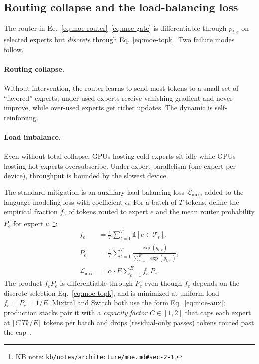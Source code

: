 \subsection{Routing collapse and the load-balancing loss}
\label{sec:ffn-load-balance}

The router in Eq.~\eqref{eq:moe-router}--\eqref{eq:moe-gate} is
differentiable through $p_{t,e}$ on selected experts but
\emph{discrete} through Eq.~\eqref{eq:moe-topk}. Two failure modes
follow.

\paragraph{Routing collapse.}
Without intervention, the router learns to send most tokens to a small
set of ``favored'' experts; under-used experts receive vanishing
gradient and never improve, while over-used experts get richer
updates. The dynamic is self-reinforcing.

\paragraph{Load imbalance.}
Even without total collapse, GPUs hosting cold experts sit idle while
GPUs hosting hot experts oversubscribe. Under expert parallelism
(one expert per device), throughput is bounded by the slowest device.

The standard mitigation is an auxiliary load-balancing loss
$\mathcal{L}_{\text{aux}}$, added to the language-modeling loss with
coefficient $\alpha$. For a batch of $T$ tokens, define the empirical
fraction $f_e$ of tokens routed to expert $e$ and the mean router
probability $P_e$ for expert
$e$~\citep[\S 2.2]{fedus2021-switch}\footnote{KB note:
\texttt{kb/notes/architecture/moe.md\#sec-2-1}. }:
\begin{align}
  f_e &= \frac{1}{T} \sum_{t=1}^T \mathbb{1}\!\left[e \in \mathcal{T}_t\right], \label{eq:moe-fe} \\
  P_e &= \frac{1}{T} \sum_{t=1}^T \frac{\exp(g_{t,e})}{\sum_{e'=1}^E \exp(g_{t,e'})}, \label{eq:moe-pe} \\
  \mathcal{L}_{\text{aux}} &= \alpha \cdot E \sum_{e=1}^{E} f_e\, P_e. \label{eq:moe-aux}
\end{align}
The product $f_e P_e$ is differentiable through $P_e$ even though
$f_e$ depends on the discrete selection
Eq.~\eqref{eq:moe-topk}, and is minimized at uniform load
$f_e = P_e = 1/E$. Mixtral and Switch both use the form
Eq.~\eqref{eq:moe-aux}; production stacks pair it with a
\emph{capacity factor} $C \in [1, 2]$ that caps each expert at
$\lceil C\,T k / E \rceil$ tokens per batch and drops (residual-only
passes) tokens routed past the
cap~\citep[\S 2.3]{fedus2021-switch}.

